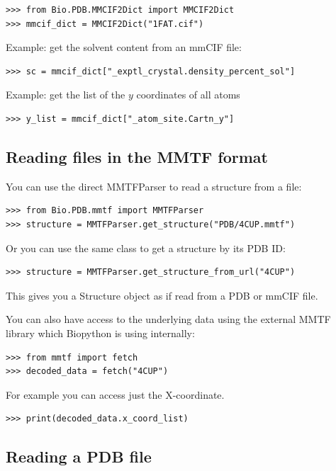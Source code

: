 \begin{verbatim}
>>> from Bio.PDB.MMCIF2Dict import MMCIF2Dict
>>> mmcif_dict = MMCIF2Dict("1FAT.cif")
\end{verbatim}

Example: get the solvent content from an mmCIF file:
\begin{verbatim}
>>> sc = mmcif_dict["_exptl_crystal.density_percent_sol"]
\end{verbatim}

Example: get the list of the $y$ coordinates of all atoms
\begin{verbatim}
>>> y_list = mmcif_dict["_atom_site.Cartn_y"]
\end{verbatim}


\subsection{Reading files in the MMTF format}

You can use the direct MMTFParser to read a structure from a file:
\begin{verbatim}
>>> from Bio.PDB.mmtf import MMTFParser
>>> structure = MMTFParser.get_structure("PDB/4CUP.mmtf")
\end{verbatim}

Or you can use the same class to get a structure by its PDB ID:
\begin{verbatim}
>>> structure = MMTFParser.get_structure_from_url("4CUP")
\end{verbatim}

This gives you a Structure object as if read from a PDB or mmCIF file.

You can also have access to the underlying data using the external
MMTF library which Biopython is using internally:
\begin{verbatim}
>>> from mmtf import fetch
>>> decoded_data = fetch("4CUP")
\end{verbatim}
For example you can access just the X-coordinate.
\begin{verbatim}
>>> print(decoded_data.x_coord_list)
\end{verbatim}

\subsection{Reading a PDB file}

